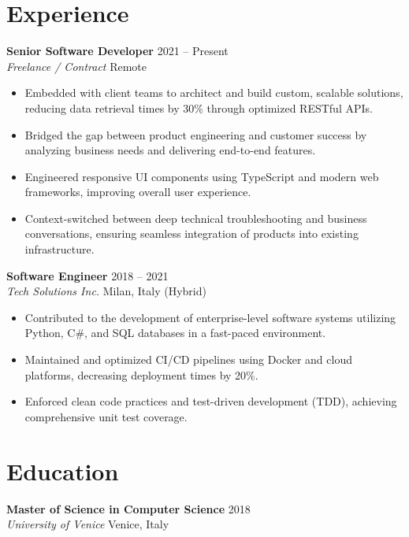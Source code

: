 \documentclass[11pt,a4paper]{article}
\begin{document}
\section*{Experience}
\noindent
\textbf{Senior Software Developer} \hfill 2021 -- Present \\
\textit{Freelance / Contract} \hfill Remote
\begin{itemize}[leftmargin=*]
    \item Embedded with client teams to architect and build custom, scalable solutions, reducing data retrieval times by 30\% through optimized RESTful APIs.
    \item Bridged the gap between product engineering and customer success by analyzing business needs and delivering end-to-end features.
    \item Engineered responsive UI components using TypeScript and modern web frameworks, improving overall user experience.
    \item Context-switched between deep technical troubleshooting and business conversations, ensuring seamless integration of products into existing infrastructure.
\end{itemize}

\vspace{2mm}
\noindent
\textbf{Software Engineer} \hfill 2018 -- 2021 \\
\textit{Tech Solutions Inc.} \hfill Milan, Italy (Hybrid)
\begin{itemize}[leftmargin=*]
    \item Contributed to the development of enterprise-level software systems utilizing Python, C\#, and SQL databases in a fast-paced environment.
    \item Maintained and optimized CI/CD pipelines using Docker and cloud platforms, decreasing deployment times by 20\%.
    \item Enforced clean code practices and test-driven development (TDD), achieving comprehensive unit test coverage.
\end{itemize}

\section*{Education}
\noindent
\textbf{Master of Science in Computer Science} \hfill 2018 \\
\textit{University of Venice} \hfill Venice, Italy
\end{document}
